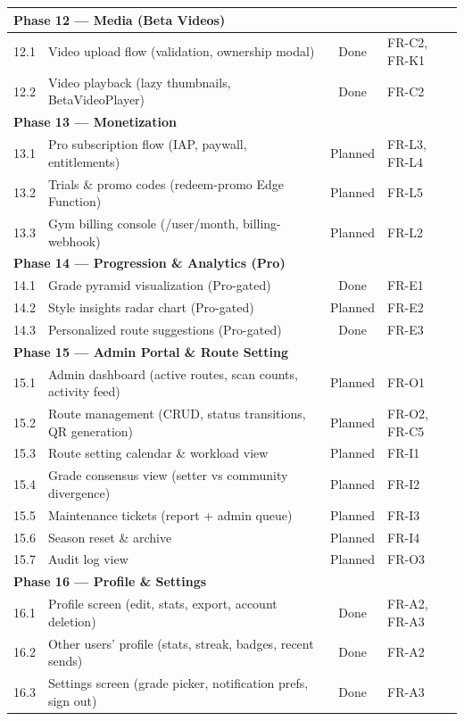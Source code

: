 \documentclass[12pt,a4paper]{report}
\renewcommand\_{\textunderscore\hspace{0pt}}
\begin{document}
\begin{longtable}{l >{\raggedright\arraybackslash}p{7.5cm} c >{\raggedright\arraybackslash}p{3cm}}
\hline
\multicolumn{4}{l}{\textbf{Phase 12 --- Media (Beta Videos)}} \\
\hline
12.1 & Video upload flow (validation, ownership modal) & Done & FR-C2, FR-K1 \\
12.2 & Video playback (lazy thumbnails, BetaVideoPlayer) & Done & FR-C2 \\

\hline
\multicolumn{4}{l}{\textbf{Phase 13 --- Monetization}} \\
\hline
13.1 & Pro subscription flow (IAP, paywall, entitlements) & Planned & FR-L3, FR-L4 \\
13.2 & Trials \& promo codes (redeem-promo Edge Function) & Planned & FR-L5 \\
13.3 & Gym billing console (\texteuro0.50/user/month, billing-webhook) & Planned & FR-L2 \\

\hline
\multicolumn{4}{l}{\textbf{Phase 14 --- Progression \& Analytics (Pro)}} \\
\hline
14.1 & Grade pyramid visualization (Pro-gated) & Done & FR-E1 \\
14.2 & Style insights radar chart (Pro-gated) & Planned & FR-E2 \\
14.3 & Personalized route suggestions (Pro-gated) & Done & FR-E3 \\

\hline
\multicolumn{4}{l}{\textbf{Phase 15 --- Admin Portal \& Route Setting}} \\
\hline
15.1 & Admin dashboard (active routes, scan counts, activity feed) & Planned & FR-O1 \\
15.2 & Route management (CRUD, status transitions, QR generation) & Planned & FR-O2, FR-C5 \\
15.3 & Route setting calendar \& workload view & Planned & FR-I1 \\
15.4 & Grade consensus view (setter vs community divergence) & Planned & FR-I2 \\
15.5 & Maintenance tickets (report + admin queue) & Planned & FR-I3 \\
15.6 & Season reset \& archive & Planned & FR-I4 \\
15.7 & Audit log view & Planned & FR-O3 \\

\hline
\multicolumn{4}{l}{\textbf{Phase 16 --- Profile \& Settings}} \\
\hline
16.1 & Profile screen (edit, stats, export, account deletion) & Done & FR-A2, FR-A3 \\
16.2 & Other users' profile (stats, streak, badges, recent sends) & Done & FR-A2 \\
16.3 & Settings screen (grade picker, notification prefs, sign out) & Done & FR-A3 \\


\end{longtable}
\end{document}
